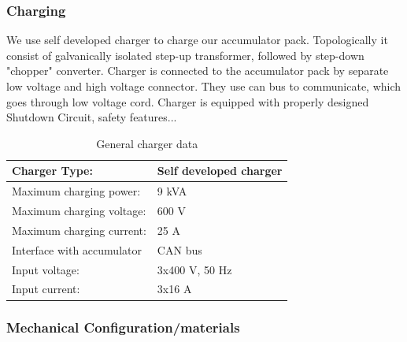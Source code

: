 \subsubsection{Charging}
We use self developed charger to charge our accumulator pack. Topologically it consist of galvanically isolated step-up transformer, followed by step-down "chopper" converter.
Charger is connected to the accumulator pack by separate low voltage and high voltage connector. They use \gls{can} bus to communicate, which goes through low voltage cord.
Charger is equipped with properly designed Shutdown Circuit, safety features...

\begin{table}[H]
	\centering
	\caption{General charger data}
	\begin{tabularx}{\textwidth}{|X|X|}
		\hline
		Charger Type: & Self developed charger \\[\TableSize]
		\hline
		Maximum charging power: & 9 kVA  \\[\TableSize]
		\hline
		Maximum charging voltage: & 600 V \\[\TableSize]
		\hline
		Maximum charging current: & 25 A \\[\TableSize]
		\hline
		Interface with accumulator & CAN bus \\[\TableSize]
		\hline
		Input voltage: & 3x400 V, 50 Hz \\[\TableSize]
		\hline
		Input current: & 3x16 A \\[\TableSize]
		\hline
	\end{tabularx}%
	\label{tab:acc-charger}%
\end{table}%

\subsubsection{Mechanical Configuration/materials}

